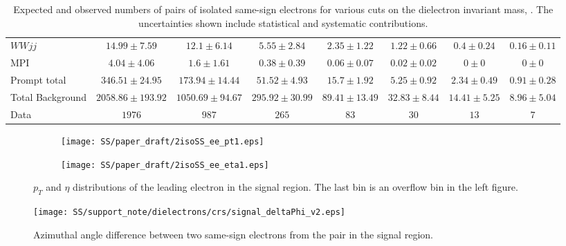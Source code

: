 \begin{table*}[htbp]
\begin{center}
{\begin{tabular}{l|c|c|c|c|c|c|c}
$WWjj$	& $ 14.99 \pm 7.59 $	& $ 12.1 \pm 6.14 $	& $ 5.55 \pm 2.84 $	& $ 2.35 \pm 1.22 $	& $ 1.22 \pm 0.66 $	& $ 0.4 \pm 0.24 $	& $ 0.16 \pm 0.11 $	\\[+0.05in]
MPI	& $ 4.04 \pm 4.06 $	& $ 1.6 \pm 1.61 $	& $ 0.38 \pm 0.39 $	& $ 0.06 \pm 0.07 $	& $ 0.02 \pm 0.02 $	& $ 0 \pm 0 $	& $ 0 \pm 0 $	\\[+0.05in]
\hline
Prompt total	& $ 346.51 \pm 24.95 $	& $ 173.94 \pm 14.44 $	& $ 51.52 \pm 4.93 $	& $ 15.7 \pm 1.92 $	& $ 5.25 \pm 0.92 $	& $ 2.34 \pm 0.49 $	& $ 0.91 \pm 0.28 $	\\[+0.05in]
\hline\hline
Total Background	& $ 2058.86 \pm 193.92 $	& $ 1050.69 \pm 94.67 $	& $ 295.92 \pm 30.99 $	& $ 89.41 \pm 13.49 $	& $ 32.83 \pm 8.44 $	& $ 14.41 \pm 5.25 $	& $ 8.96 \pm 5.04 $	\\[+0.05in]
\hline\hline
Data	& $ 1976 $	& $ 987 $	& $ 265 $	& $ 83 $	& $ 30 $	& $ 13 $	& $ 7 $	\\[+0.05in]

\hline
\end{tabular}
}
\end{center}
\caption{Expected and observed numbers of pairs of isolated same-sign electrons for various cuts on the dielectron invariant mass, \mee. The uncertainties shown include statistical and systematic contributions.}
\label{tab:2iso_ee_SS}
\end{table*}


\begin{figure}
\begin{subfigure}{.5\textwidth}
  \centering
  \texttt{[image: SS/paper\_draft/2isoSS\_ee\_pt1.eps]}
\end{subfigure}%
\begin{subfigure}{.5\textwidth}
  \centering
  \texttt{[image: SS/paper\_draft/2isoSS\_ee\_eta1.eps]}
\end{subfigure}
\caption{$p_T$ and $\eta$ distributions of the leading electron in the signal region. The last bin is an overflow bin in the left figure.}
  \label{fig:signal_kinematics}
\end{figure}

\begin{figure}[h]
\begin{center}
\texttt{[image: SS/support\_note/dielectrons/crs/signal\_deltaPhi\_v2.eps]}
\caption{Azimuthal angle difference between two same-sign electrons from the pair in the signal region.}
\label{fig:delta_phi}
\end{center}
\end{figure}



